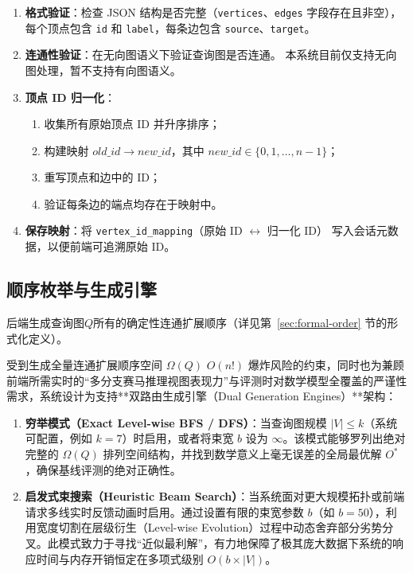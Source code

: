\documentclass[12pt,a4paper]{article}
\begin{document}
\begin{enumerate}
  \item \textbf{格式验证}：检查 JSON 结构是否完整（\texttt{vertices}、\texttt{edges} 字段存在且非空），
        每个顶点包含 \texttt{id} 和 \texttt{label}，每条边包含 \texttt{source}、\texttt{target}。

  \item \textbf{连通性验证}：在无向图语义下验证查询图是否连通。
        本系统目前仅支持无向图处理，暂不支持有向图语义。

  \item \textbf{顶点 ID 归一化}：
        \begin{enumerate}
          \item 收集所有原始顶点 ID 并升序排序；
          \item 构建映射 $\mathit{old\_id} \to \mathit{new\_id}$，其中
                $\mathit{new\_id} \in \{0, 1, \dots, n{-}1\}$；
          \item 重写顶点和边中的 ID；
          \item 验证每条边的端点均存在于映射中。
        \end{enumerate}
        
  \item \textbf{保存映射}：将 \texttt{vertex\_id\_mapping}（原始 ID $\leftrightarrow$ 归一化 ID）
        写入会话元数据，以便前端可追溯原始 ID。
\end{enumerate}

\subsection{顺序枚举与生成引擎}

后端生成查询图$Q$所有的确定性连通扩展顺序（详见第~\ref{sec:formal-order} 节的形式化定义）。

\label{sec:order-enumeration}

受到生成全量连通扩展顺序空间 $\Omega(Q)$ $O(n!)$ 爆炸风险的约束，同时也为兼顾前端所需实时的“多分支赛马推理视图表现力”与评测时对数学模型全覆盖的严谨性需求，系统设计为支持**双路由生成引擎（Dual Generation Engines）**架构：

\begin{enumerate}
  \item \textbf{穷举模式（Exact Level-wise BFS / DFS）}：当查询图规模 $|V| \le k$（系统可配置，例如 $k=7$）时启用，或者将束宽 $b$ 设为 $\infty$。该模式能够罗列出绝对完整的 $\Omega(Q)$ 排列空间结构，并找到数学意义上毫无误差的全局最优解 $O^*$，确保基线评测的绝对正确性。
  \item \textbf{启发式束搜索（Heuristic Beam Search）}：当系统面对更大规模拓扑或前端请求多线实时反馈动画时启用。通过设置有限的束宽参数 $b$（如 $b=50$），利用宽度切割在层级衍生（Level-wise Evolution）过程中动态舍弃部分劣势分叉。此模式致力于寻找“近似最利解”，有力地保障了极其庞大数据下系统的响应时间与内存开销恒定在多项式级别 $O(b \times |V|)$。
\end{enumerate}
\end{document}
